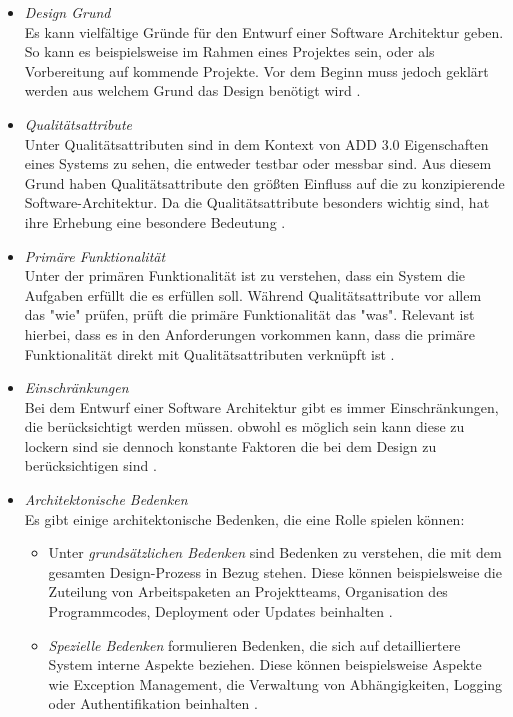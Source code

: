 \begin{itemize}
\item \emph{Design Grund} \\
Es kann vielf\"altige Gr\"unde f\"ur den Entwurf einer Software Architektur geben. So kann es beispielsweise im Rahmen eines Projektes sein, oder als Vorbereitung auf kommende Projekte. Vor dem Beginn muss jedoch gekl\"art werden aus welchem Grund das Design ben\"otigt wird \cite{Cer01}.
\item \emph{Qualit\"atsattribute} \\
Unter Qualit\"atsattributen sind in dem Kontext von ADD 3.0 Eigenschaften eines Systems zu sehen, die entweder testbar oder messbar sind. Aus diesem Grund haben Qualit\"atsattribute den gr\"o\ss{}ten Einfluss auf die zu konzipierende Software-Architektur. Da die Qualit\"atsattribute besonders wichtig sind, hat ihre Erhebung eine besondere Bedeutung \cite{Cer01}.
\item \emph{Prim\"are Funktionalit\"at} \\
Unter der prim\"aren Funktionalit\"at ist zu verstehen, dass ein System die Aufgaben erf\"ullt die es erf\"ullen soll. W\"ahrend Qualit\"atsattribute vor allem das "wie" pr\"ufen, pr\"uft die prim\"are Funktionalit\"at das "was". Relevant ist hierbei, dass es in den Anforderungen vorkommen kann, dass die prim\"are Funktionalit\"at direkt mit Qualit\"atsattributen verkn\"upft ist \cite{Cer01}. 
\item \emph{Einschr\"ankungen} \\
Bei dem Entwurf einer Software Architektur gibt es immer Einschr\"ankungen, die ber\"ucksichtigt werden m\"ussen. obwohl es m\"oglich sein kann diese zu lockern sind sie dennoch konstante Faktoren die bei dem Design zu ber\"ucksichtigen sind \cite{Cer01}.
\item \emph{Architektonische Bedenken} \\
Es gibt einige architektonische Bedenken, die eine Rolle spielen k\"onnen:
\begin{itemize}
\item Unter \emph{grunds\"atzlichen Bedenken} sind Bedenken zu verstehen, die mit dem gesamten Design-Prozess in Bezug stehen. Diese k\"onnen beispielsweise die Zuteilung von Arbeitspaketen an Projektteams, Organisation des Programmcodes, Deployment oder Updates beinhalten \cite{Cer01}.
\item \emph{Spezielle Bedenken} formulieren Bedenken, die sich auf detailliertere System interne Aspekte beziehen. Diese k\"onnen beispielsweise Aspekte wie Exception Management, die Verwaltung von Abh\"angigkeiten, Logging oder Authentifikation beinhalten \cite{Cer01}.

\end{itemize}
\end{itemize}
